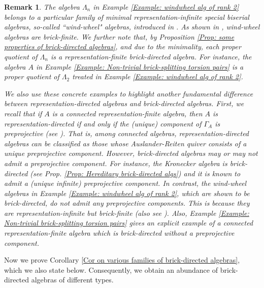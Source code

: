\documentclass{amsart}
\theoremstyle{thmstyle}
\theoremstyle{exstyle}
\theoremstyle{defstyle}
\theoremstyle{remstyle}
\newtheorem{remark}[thm]{Remark}
\theoremstyle{remstyle}
\begin{document}
\begin{remark}\label{Rem: windwheel algebras}
The algebra $\Lambda_n$ in Example \ref{Example: windwheel alg of rank 2} belongs to a particular family of minimal representation-infinite special biserial algebras, so-called ``wind-wheel" algebras, introduced in \cite{Ri2}. As shown in \cite[Prop. 3.1.10]{Mo2}, wind-wheel algebras are brick-finite. 
We further note that, by Proposition \ref{Prop: some properties of brick-directed algebras}, and due to the minimality, each proper quotient of $\Lambda_n$ is a representation-finite brick-directed algebra. 
For instance, the algebra $A$ in Example \ref{Example: Non-trivial brick-splitting torsion pairs} is a proper quotient of $\Lambda_2$ treated in Example \ref{Example: windwheel alg of rank 2}. 

We also use these concrete examples to highlight another fundamental difference between representation-directed algebras and brick-directed algebras. First, we recall that if $A$ is a connected representation-finite algebra, then $A$ is representation-directed if and only if the (unique) component of $\Gamma_A$ is preprojective (see \cite[IX.3, Lemma 3.5]{ASS}). That is, among connected algebras, representation-directed algebras can be classified as those whose Auslander-Reiten quiver consists of a unique preprojective component. However, brick-directed algebras may or may not admit a preprojective component. For instance, the Kronecker algebra is brick-directed (see Prop. \ref{Prop: Hereditary brick-directed algs}) and it is known to admit a (unique infinite) preprojective component. In contrast, the wind-wheel algebras in Example \ref{Example: windwheel alg of rank 2}, which are shown to be brick-directed, do not admit any preprojective components. This is because they are representation-infinite but brick-finite (also see \cite{Mo1}). Also, Example \ref{Example: Non-trivial brick-splitting torsion pairs} gives an explicit example of a connected representation-finite algebra which is brick-directed without a preprojective component.
\end{remark}

Now we prove Corollary \ref{Cor on various families of brick-directed algebras}, which we also state below. Consequently, we obtain an abundance of brick-directed algebras of different types.
\end{document}

